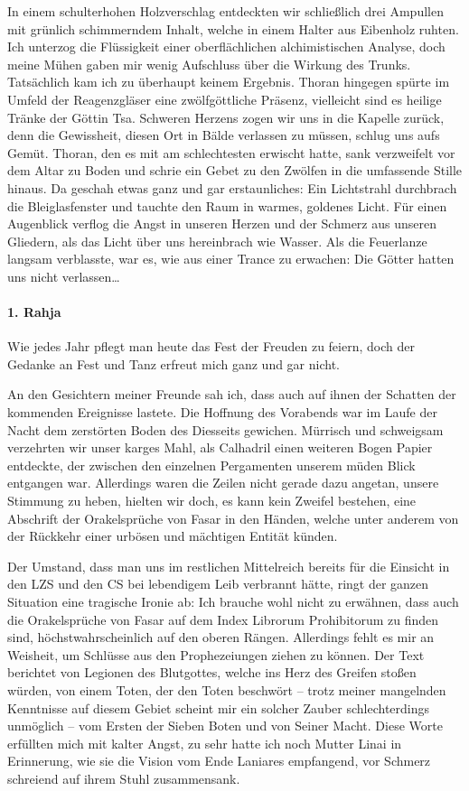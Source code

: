 In einem schulterhohen Holzverschlag entdeckten wir schließlich drei Ampullen mit grünlich schimmerndem Inhalt, welche in einem Halter aus Eibenholz ruhten. Ich unterzog die Flüssigkeit einer oberflächlichen alchimistischen Analyse, doch meine Mühen gaben mir wenig Aufschluss über die Wirkung des Trunks. Tatsächlich kam ich zu überhaupt keinem Ergebnis. Thoran hingegen spürte im Umfeld der Reagenzgläser eine zwölfgöttliche Präsenz, vielleicht sind es heilige Tränke der Göttin Tsa. Schweren Herzens zogen wir uns in die Kapelle zurück, denn die Gewissheit, diesen Ort in Bälde verlassen zu müssen, schlug uns aufs Gemüt. Thoran, den es mit am schlechtesten erwischt hatte, sank verzweifelt vor dem Altar zu Boden und schrie ein Gebet zu den Zwölfen in die umfassende Stille hinaus. Da geschah etwas ganz und gar erstaunliches: Ein Lichtstrahl durchbrach die Bleiglasfenster und tauchte den Raum in warmes, goldenes Licht. Für einen Augenblick verflog die Angst in unseren Herzen und der Schmerz aus unseren Gliedern, als das Licht über uns hereinbrach wie Wasser. Als die Feuerlanze langsam verblasste, war es, wie aus einer Trance zu erwachen: Die Götter hatten uns nicht verlassen\dots

\paragraph{1. Rahja} Wie jedes Jahr pflegt man heute das Fest der Freuden zu feiern, doch der Gedanke an Fest und Tanz erfreut mich ganz und gar nicht.


An den Gesichtern meiner Freunde sah ich, dass auch auf ihnen der Schatten der kommenden Ereignisse lastete. Die Hoffnung des Vorabends war im Laufe der Nacht dem zerstörten Boden des Diesseits gewichen. Mürrisch und schweigsam verzehrten wir unser karges Mahl, als Calhadril einen weiteren Bogen Papier entdeckte, der zwischen den einzelnen Pergamenten unserem müden Blick entgangen war. Allerdings waren die Zeilen nicht gerade dazu angetan, unsere Stimmung zu heben, hielten wir doch, es kann kein Zweifel bestehen, eine Abschrift der Orakelsprüche von Fasar in den Händen, welche unter anderem von der Rückkehr einer urbösen und mächtigen Entität künden.


Der Umstand, dass man uns im restlichen Mittelreich bereits für die Einsicht in den LZS und den CS bei lebendigem Leib verbrannt hätte, ringt der ganzen Situation eine tragische Ironie ab: Ich brauche wohl nicht zu erwähnen, dass auch die Orakelsprüche von Fasar auf dem Index Librorum Prohibitorum zu finden sind, höchstwahrscheinlich auf den oberen Rängen. Allerdings fehlt es mir an Weisheit, um Schlüsse aus den Prophezeiungen ziehen zu können. Der Text berichtet von Legionen des Blutgottes, welche ins Herz des Greifen stoßen würden, von einem Toten, der den Toten beschwört -- trotz meiner mangelnden Kenntnisse auf diesem Gebiet scheint mir ein solcher Zauber schlechterdings unmöglich -- vom Ersten der Sieben Boten und von Seiner Macht. Diese Worte erfüllten mich mit kalter Angst, zu sehr hatte ich noch Mutter Linai in Erinnerung, wie sie die Vision vom Ende Laniares empfangend, vor Schmerz schreiend auf ihrem Stuhl zusammensank.


